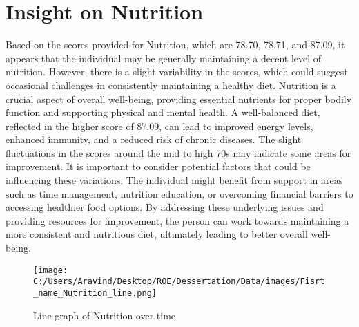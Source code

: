 \documentclass[10pt, a4paper]{article}%
\begin{document}
\section{Insight on Nutrition}%
\label{sec:InsightonNutrition}%
Based on the scores provided for Nutrition, which are 78.70, 78.71, and 87.09, it appears that the individual may be generally maintaining a decent level of nutrition. However, there is a slight variability in the scores, which could suggest occasional challenges in consistently maintaining a healthy diet. Nutrition is a crucial aspect of overall well{-}being, providing essential nutrients for proper bodily function and supporting physical and mental health. A well{-}balanced diet, reflected in the higher score of 87.09, can lead to improved energy levels, enhanced immunity, and a reduced risk of chronic diseases.\newline%
\newline%
The slight fluctuations in the scores around the mid to high 70s may indicate some areas for improvement. It is important to consider potential factors that could be influencing these variations. The individual might benefit from support in areas such as time management, nutrition education, or overcoming financial barriers to accessing healthier food options. By addressing these underlying issues and providing resources for improvement, the person can work towards maintaining a more consistent and nutritious diet, ultimately leading to better overall well{-}being.%


\begin{figure}[H]%
\centering%
\texttt{[image: C:/Users/Aravind/Desktop/ROE/Dessertation/Data/images/Fisrt\_name\_Nutrition\_line.png]}%
\caption{Line graph of Nutrition over time}%
\end{figure}

%
\end{document}
